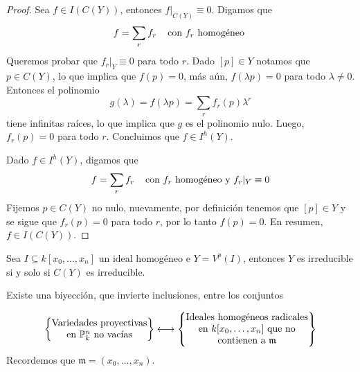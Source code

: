 \documentclass[11pt]{article}
\def \m {\mathfrak{m}}
\begin{document}
\begin{proof}
    Sea $f\in I(C(Y))$, entonces $f|_{C(Y)}\equiv0$. Digamos que
    \begin{equation*}
        f=\sum_{r}f_{r} \hspace{4mm}\text{con $f_{r}$ homogéneo }
    \end{equation*}
    Queremos probar que $f_{r}|_{Y}\equiv0$ para todo $r$. Dado $[p]\in Y$ notamos que 
    $p\in C(Y)$, lo que implica que $f(p)=0$, más aún, $f(\lambda p)=0$ para todo $\lambda\neq0$.
    Entonces el polinomio
    \begin{equation*}
        g(\lambda)=f(\lambda p)=\sum_{r}f_{r}(p)\lambda^{r}
    \end{equation*}
    tiene infinitas raíces, lo que implica que $g$ es el polinomio nulo. Luego, $f_{r}(p)=0$ para 
    todo $r$. Concluimos que $f\in I^{h}(Y)$.

    \vspace{1mm}
    Dado $f\in I^{h}(Y)$, digamos que
    \begin{equation*}
        f=\sum_{r}f_{r} \hspace{4mm}\text{con $f_{r}$ homogéneo y }f_{r}|_{Y}\equiv0
    \end{equation*}
    Fijemos $p\in C(Y)$ no nulo, nuevamente, por definición tenemos que $[p]\in Y$ y se sigue que 
    $f_{r}(p)=0$ para todo $r$, por lo tanto $f(p)=0$. En resumen, $f\in I(C(Y))$.
\end{proof}

\begin{cor}
    Sea $I\subseteq k[x_{0},\dots,x_{n}]$ un ideal homogéneo e $Y=V^{p}(I)$, entonces $Y$ es
    irreducible si y solo si $C(Y)$ es irreducible.
\end{cor}

\begin{teo}
    Existe una biyección, que invierte inclusiones, entre los conjuntos
    
    \begin{equation*}
        \begin{Bmatrix}
            \text{Variedades proyectivas} \\
            \text{en }\P_{k}^{n} \text{ no vacías}
        \end{Bmatrix}
        \longleftrightarrow
        \begin{Bmatrix}
            \text{Ideales homogéneos radicales} \\
            \text{en }k[x_{0},\dots,x_{n}] \text{ que no} \\
            \text{contienen a }\m
        \end{Bmatrix}
    \end{equation*}
    Recordemos que $\m=(x_{0},\dots,x_{n})$.
\end{teo}
\end{document}
